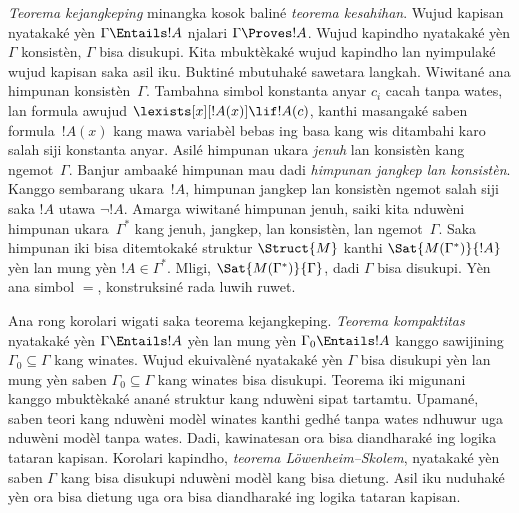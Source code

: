 \emph{Teorema kejangkeping} minangka kosok baliné \emph{teorema
kesahihan}. Wujud kapisan nyatakaké yèn
$\Gamma\Entails !A$ njalari $\Gamma\Proves !A$. Wujud kapindho
nyatakaké yèn $\Gamma$ konsistèn, $\Gamma$ bisa disukupi.
Kita mbuktèkaké wujud kapindho lan nyimpulaké wujud kapisan
saka asil iku. Buktiné mbutuhaké sawetara langkah. Wiwitané
ana himpunan konsistèn~$\Gamma$. Tambahna simbol konstanta
anyar $c_i$ cacah tanpa wates, lan formula awujud
$\lexists[x][!A(x)]\lif !A(c)$, kanthi masangaké saben
formula~$!A(x)$ kang mawa variabèl bebas ing basa kang wis
ditambahi karo salah siji konstanta anyar. Asilé himpunan ukara
\emph{jenuh} lan konsistèn kang ngemot~$\Gamma$.
Banjur ambaaké himpunan mau dadi \emph{himpunan jangkep lan
konsistèn}. Kanggo sembarang ukara~$!A$, himpunan jangkep lan
konsistèn ngemot salah siji saka $!A$ utawa $\lnot !A$.
Amarga wiwitané himpunan jenuh, saiki kita nduwèni himpunan
ukara~$\Gamma^*$ kang jenuh, jangkep, lan konsistèn, lan
ngemot~$\Gamma$. Saka himpunan iki bisa ditemtokaké struktur
$\Struct{M}$ kanthi $\Sat{M(\Gamma^*)}{!A}$ yèn lan mung yèn
$!A\in\Gamma^*$. Mligi, $\Sat{M(\Gamma^*)}{\Gamma}$, dadi
$\Gamma$ bisa disukupi. Yèn ana simbol $=$, konstruksiné rada
luwih ruwet.

Ana rong korolari wigati saka teorema kejangkeping.
\emph{Teorema kompaktitas} nyatakaké yèn $\Gamma\Entails !A$
yèn lan mung yèn $\Gamma_0\Entails !A$ kanggo sawijining
$\Gamma_0\subseteq\Gamma$ kang winates. Wujud ekuivalèné
nyatakaké yèn $\Gamma$ bisa disukupi yèn lan mung yèn saben
$\Gamma_0\subseteq\Gamma$ kang winates bisa disukupi.
Teorema iki migunani kanggo mbuktèkaké anané struktur kang
nduwèni sipat tartamtu. Upamané, saben teori kang nduwèni
modèl winates kanthi gedhé tanpa wates ndhuwur uga nduwèni
modèl tanpa wates. Dadi, kawinatesan ora bisa diandharaké
ing logika tataran kapisan. Korolari kapindho, \emph{teorema
L\"owenheim--Skolem}, nyatakaké yèn saben $\Gamma$ kang bisa
disukupi nduwèni modèl kang bisa dietung. Asil iku nuduhaké
yèn ora bisa dietung uga ora bisa diandharaké ing logika tataran
kapisan.
